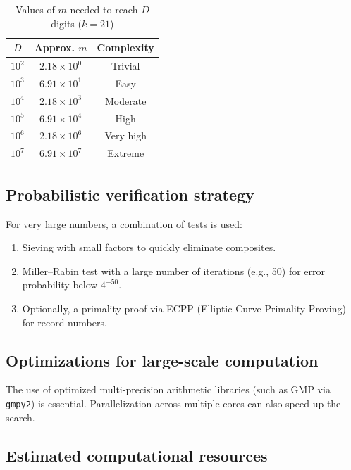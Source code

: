 \documentclass[11pt,a4paper]{article}
\theoremstyle{definition}
\theoremstyle{plain}
\def\textbf#1{#1}%
\begin{document}
\begin{table}[H]
\centering
\caption{Values of $m$ needed to reach $D$ digits ($k=21$)}\label{tab:large_n}
\begin{tabular}{@{}ccc@{}}
\toprule
\textbf{$D$} & \textbf{Approx. $m$} & \textbf{Complexity} \\
\midrule
$10^2$ & $2.18 \times 10^0$ & Trivial \\
$10^3$ & $6.91 \times 10^1$ & Easy \\
$10^4$ & $2.18 \times 10^3$ & Moderate \\
$10^5$ & $6.91 \times 10^4$ & High \\
$10^6$ & $2.18 \times 10^6$ & Very high \\
$10^7$ & $6.91 \times 10^7$ & Extreme \\
\bottomrule
\end{tabular}
\end{table}

\subsection{Probabilistic verification strategy}

For very large numbers, a combination of tests is used:
\begin{enumerate}
    \item Sieving with small factors to quickly eliminate composites.
    \item Miller--Rabin test with a large number of iterations (e.g., 50) for error probability below $4^{-50}$.
    \item Optionally, a primality proof via ECPP (Elliptic Curve Primality Proving) for record numbers.
\end{enumerate}

\subsection{Optimizations for large-scale computation}

The use of optimized multi-precision arithmetic libraries (such as GMP via \texttt{gmpy2}) is essential. Parallelization across multiple cores can also speed up the search.

\subsection{Estimated computational resources}
\end{document}
